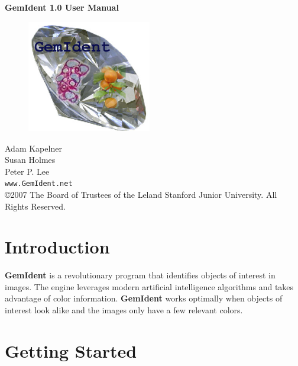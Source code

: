 \documentclass[12pt]{article}
\begin{document}
\thispagestyle{empty}
\begin{center}
\huge\bf {\bf GemIdent} 1.0 User Manual
\end{center}

\vspace{3cm}
\begin{figure}[htp]
\centering
\includegraphics[width=154pt,height=139pt]{logo.jpg}
\label{fig:logo}
\end{figure}


\vspace{6cm}
\begin{flushright} 

\vspace{1cm}
\sf
Adam Kapelner \\
Susan Holmes \\
Peter P. Lee \\
\vspace{1cm}
{\tt www.GemIdent.net} \\
\vspace{1cm}
{\footnotesize \copyright 2007 The Board of Trustees of the Leland Stanford Junior University. All Rights Reserved.}
\end{flushright}

\pagebreak

\section{Introduction\label{Introduction}}

{\bf GemIdent} is a revolutionary program that identifies objects of interest in images. The engine leverages modern artificial intelligence algorithms and takes advantage of color information. {\bf GemIdent} works optimally when objects of interest look alike and the images only have a few relevant colors.

\section{Getting Started\label{getting_started}}
\end{document}
